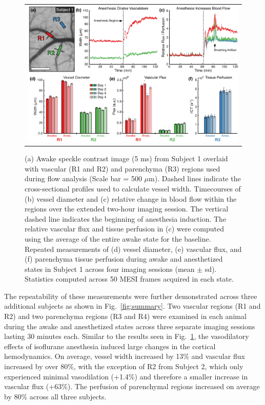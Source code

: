 \documentclass[12pt]{spieman}
\begin{document}
\begin{spacing}{2}
\begin{figure}
    \begin{center}
        \begin{tabular}{c}
            \includegraphics[width=6.25in]{Figure2.pdf}
        \end{tabular}
    \end{center}
    \caption {
        \label{fig:acute}
        (a) Awake speckle contrast image (5 ms) from Subject 1 overlaid with vascular (R1 and R2) and parenchyma (R3) regions used during flow analysis (Scale bar = 500 $\mu$m). Dashed lines indicate the cross-sectional profiles used to calculate vessel width. Timecourses of (b) vessel diameter and (c) relative change in blood flow within the regions over the extended two-hour imaging session. The vertical dashed line indicates the beginning of anesthesia induction. The relative vascular flux and tissue perfusion in (c) were computed using the average of the entire awake state for the baseline. Repeated measurements of (d) vessel diameter, (e) vascular flux, and (f) parenchyma tissue perfusion during awake and anesthetized states in Subject 1 across four imaging sessions (mean $\pm$ sd). Statistics computed across 50 MESI frames acquired in each state.
    }
\end{figure}

The repeatability of these measurements were further demonstrated across three additional subjects as shown in Fig.~\ref{fig:summary}. Two vascular regions (R1 and R2) and two parenchyma regions (R3 and R4) were examined in each animal during the awake and anesthetized states across three separate imaging sessions lasting 30 minutes each. Similar to the results seen in Fig.~\ref{fig:acute}, the vasodilatory effects of isoflurane anesthesia induced large changes in the cortical hemodynamics. On average, vessel width increased by 13\% and vascular flux increased by over 80\%, with the exception of R2 from Subject 2, which only experienced minimal vasodilation (+1.4\%) and therefore a smaller increase in vascular flux (+63\%). The perfusion of parenchymal regions increased on average by 80\% across all three subjects.


\end{spacing}
\end{document}
